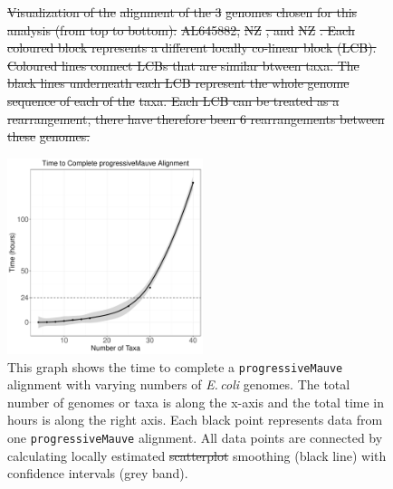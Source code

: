 \documentclass[11pt]{article}
\newcommand{\strep}{\textit{Streptomyces}\xspace}
\newcommand{\ecol}{\textit{E.\,coli}\xspace}
\newcommand{\p}{\texttt{progressiveMauve}\xspace}
\newcommand{\sliv}{\textit{S.\,lividans}\xspace}
\newcommand{\scoe}{\textit{S.\,coelicolor}\xspace}
\providecommand{\DIFaddtex}[1]{{\protect\color{blue}\uwave{#1}}} %
\providecommand{\DIFdeltex}[1]{{\protect\color{red}\sout{#1}}}                      %
\providecommand{\DIFaddFL}[1]{\DIFadd{#1}} %
\providecommand{\DIFdelFL}[1]{\DIFdel{#1}} %
\providecommand{\DIFaddbeginFL}{} %
\providecommand{\DIFaddendFL}{} %
\providecommand{\DIFdelbeginFL}{} %
\providecommand{\DIFdelendFL}{} %
\providecommand{\DIFadd}[1]{\texorpdfstring{\DIFaddtex{#1}}{#1}} %
\providecommand{\DIFdel}[1]{\texorpdfstring{\DIFdeltex{#1}}{}} %
\begin{document}
	\begin{figure}[H]
	\begin{center}
		\DIFdelbeginFL %
{%
\DIFdelFL{Visualization of the }%
\DIFdelFL{alignment of the 3 }%
\DIFdelFL{genomes chosen for this analysis (from top to bottom): }%
\DIFdelFL{AL645882, }%
\DIFdelFL{NZ}%
\DIFdelFL{, and }%
\DIFdelFL{NZ}%
\DIFdelFL{. Each coloured block represents a different locally co-linear block (LCB). Coloured lines connect LCBs that are similar btween taxa. The black lines underneath each LCB represent the whole genome sequence of each of the }%
\DIFdelFL{taxa. Each LCB can be treated as a rearrangement, there have therefore been 6 rearrangements between these }%
\DIFdelFL{genomes.}}

\DIFdelendFL \includegraphics[width=0.51\textwidth]{./figs/mauve_time_plot}
		\caption{\label{fig:mauvetimeplot} This graph shows the time to complete a \p alignment with varying numbers of \ecol genomes. The total number of genomes or taxa is along the x-axis and the total time in hours is along the right axis. Each black point represents data from one \p alignment. All data points are connected by calculating locally estimated \DIFdelbeginFL \DIFdelFL{scatterplot }\DIFdelendFL \DIFaddbeginFL \DIFaddFL{scatter plot }\DIFaddendFL smoothing (black line) with confidence intervals (grey band).}
	\end{center}
\end{figure}
\end{document}
